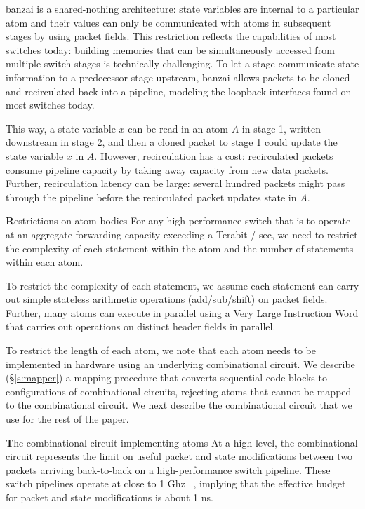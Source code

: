 banzai is a shared-nothing architecture: state variables are internal to a
particular atom and their values can only be communicated with atoms in
subsequent stages by using packet fields.  This restriction reflects the
capabilities of most switches today: building memories that can be
simultaneously accessed from multiple switch stages is technically challenging.
To let a stage communicate state information to a predecessor stage upstream,
banzai allows packets to be cloned and recirculated back into a pipeline,
modeling the loopback interfaces found on most switches today.

This way, a state variable $x$ can be read in an atom $A$ in stage 1, written
downstream in stage 2, and then a cloned packet to stage 1 could update the
state variable $x$ in $A$.  However, recirculation has a cost: recirculated
packets consume pipeline capacity by taking away capacity from new data
packets. Further, recirculation latency can be large: several hundred packets
might pass through the pipeline before the recirculated packet updates state in
$A$.

{\textbf Restrictions on atom bodies}
For any high-performance switch that is to operate at an aggregate forwarding
capacity exceeding a Terabit / sec, we need to restrict the complexity of each
statement within the atom and the number of statements within each atom.

To restrict the complexity of each statement, we assume each statement can
carry out simple stateless arithmetic operations (add/sub/shift) on packet
fields. Further, many atoms can execute in parallel using a Very Large
Instruction Word that carries out operations on distinct header fields in
parallel.

To restrict the length of each atom, we note that each atom needs to be
implemented in hardware using an underlying combinational circuit. We describe
(\S\ref{s:mapper}) a mapping procedure that converts sequential code blocks to
configurations of combinational circuits, rejecting atoms that cannot be mapped
to the combinational circuit. We next describe the combinational circuit that
we use for the rest of the paper.

{\textbf The combinational circuit implementing atoms}
At a high level, the combinational circuit represents the limit on useful
packet and state modifications between two packets arriving back-to-back on a
high-performance switch pipeline. These switch pipelines operate at close to 1
Ghz ~\cite{rmt}, implying that the effective budget for packet and state
modifications is about 1 ns.

